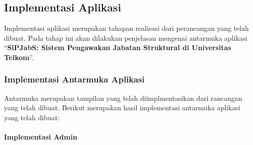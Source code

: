 \chapter{\babEmpat}

\section{Implementasi Aplikasi}

Implementasi aplikasi merupakan tahapan realisasi dari perancangan yang telah dibuat. Pada tahap ini akan dilakukan penjelasan mengenai antarmuka aplikasi “\textbf{SiPJabS: Sistem Pengawakan Jabatan Struktural di Universitas Telkom}”. 

\subsection{Implementasi Antarmuka Aplikasi}
Antarmuka merupakan tampilan yang telah diimplmentasikan dari rancangan yang telah dibuat. Berikut merupakan hasil implementasi antarmuka aplikasi yang telah dibuat:

\subsubsection{Implementasi Admin}

